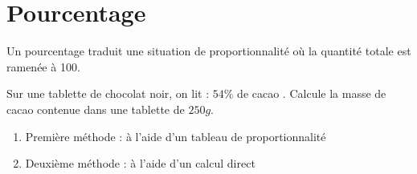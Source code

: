 \documentclass[a4paper,10pt]{report}
\begin{document}
\section{Pourcentage}

\begin{defn}
Un pourcentage traduit une situation de proportionnalité où la quantité totale est ramenée à 100.
\end{defn}

\begin{ex}
Sur une tablette de chocolat noir, on lit : \og $54 \%$ de cacao \fg{}. Calcule la masse de cacao contenue dans une tablette de $250g$.
\begin{enumerate}
\item[•]Première méthode : à l'aide d'un tableau de proportionnalité

\noindent\grandscarreaux{\linewidth}{4.6cm}
\item[•]Deuxième méthode : à l'aide d'un calcul direct

\noindent\grandscarreaux{\linewidth}{4.6cm}
\end{enumerate} 
\end{ex}
\end{document}
